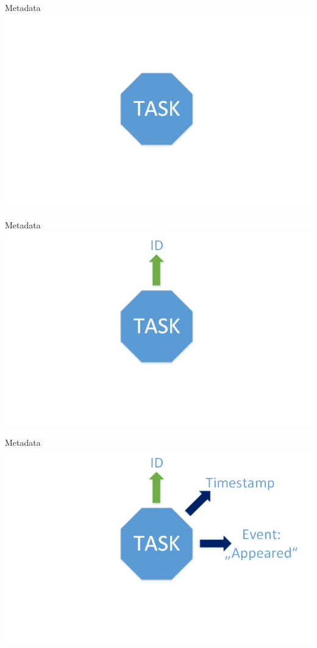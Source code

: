 	\begin{frame}{Metadata}
	\includegraphics[width=1.0\textwidth]{images/Task/zeichnungstep5.png}
	\end{frame}
	
	\begin{frame}{Metadata}
	\includegraphics[width=1.0\textwidth]{images/Task/zeichnungstep4.png}
	\end{frame}
	
	\begin{frame}{Metadata}
	\includegraphics[width=1.0\textwidth]{images/Task/zeichnungstep3.png}
	\end{frame}
	
